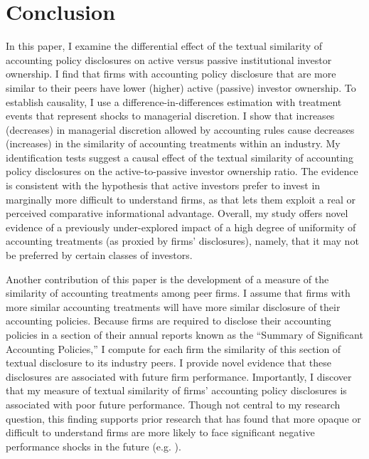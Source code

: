 \documentclass[thesis]{thesis-umich}
\begin{document}
\chapter{Conclusion}\label{chap:conclusion} 
In this paper, I examine the differential effect of the textual similarity of accounting policy disclosures on active versus passive institutional investor ownership. I find that firms with accounting policy disclosure that are more similar to their peers have lower (higher) active (passive) investor ownership. To establish causality, I use a difference-in-differences estimation with treatment events that represent shocks to managerial discretion. I show that increases (decreases) in managerial discretion allowed by accounting rules cause decreases (increases) in the similarity of accounting treatments within an industry. My identification tests suggest a causal effect of the textual similarity of accounting policy disclosures on the active-to-passive investor ownership ratio. The evidence is consistent with the hypothesis that active investors prefer to invest in marginally more difficult to understand firms, as that lets them exploit a real or perceived comparative informational advantage. Overall, my study offers novel evidence of a previously under-explored impact of a high degree of uniformity of accounting treatments (as proxied by firms' disclosures), namely, that it may not be preferred by certain classes of investors.

Another contribution of this paper is the development of a measure of the similarity of accounting treatments among peer firms. I assume that firms with more similar accounting treatments will have more similar disclosure of their accounting policies. Because firms are required to disclose their accounting policies in a section of their annual reports known as the ``Summary of Significant Accounting Policies,'' I compute for each firm the similarity of this section of textual disclosure to its industry peers. I provide novel evidence that these disclosures are associated with future firm performance. Importantly, I discover that my measure of textual similarity of firms' accounting policy disclosures is associated with poor future performance. Though not central to my research question, this finding supports prior research that has found that more opaque or difficult to understand firms are more likely to face significant negative performance shocks in the future (e.g. \cite{kimetal2016}).
\end{document}
